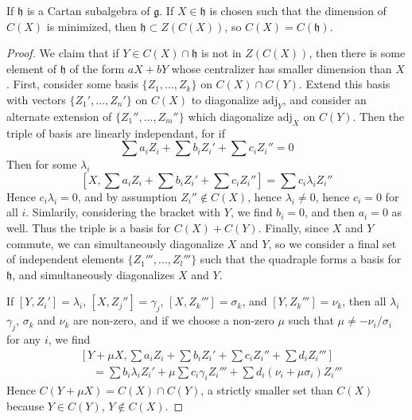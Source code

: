 \begin{lemma}
    If $\mathfrak{h}$ is a Cartan subalgebra of $\mathfrak{g}$. If $X \in \mathfrak{h}$ is chosen such that the dimension of $C(X)$ is minimized, then $\mathfrak{h} \subset Z(C(X))$, so $C(X) = C(\mathfrak{h})$.
\end{lemma}
\begin{proof}
    We claim that if $Y \in C(X) \cap \mathfrak{h}$ is not in $Z(C(X))$, then there is some element of $\mathfrak{h}$ of the form $aX + bY$ whose centralizer has smaller dimension than $X$. First, consider some basis $\{ Z_1, \dots, Z_k \}$ on $C(X) \cap C(Y)$. Extend this basis with vectors $\{ Z_1', \dots, Z_n' \}$ on $C(X)$ to diagonalize $\text{adj}_Y$, and consider an alternate extension of $\{ Z_1'', \dots, Z_m'' \}$ which diagonalize $\text{adj}_X$ on $C(Y)$. Then the triple of basis are linearly independant, for if
    \[ \sum a_i Z_i + \sum b_i Z_i' + \sum c_i Z_i'' = 0 \]
    Then for some $\lambda_i$
    \[ \left[ X, \sum a_i Z_i + \sum b_i Z_i' + \sum c_i Z_i'' \right] = \sum c_i \lambda_i Z_i'' \]
    Hence $c_i \lambda_i = 0$, and by assumption $Z_i'' \not \in C(X)$, hence $\lambda_i \neq 0$, hence $c_i = 0$ for all $i$. Simlarily, considering the bracket with $Y$, we find $b_i = 0$, and then $a_i = 0$ as well. Thus the triple is a basis for $C(X) + C(Y)$. Finally, since $X$ and $Y$ commute, we can simultaneously diagonalize $X$ and $Y$, so we consider a final set of independent elements $\{ Z_1''', \dots, Z_l''' \}$ such that the quadraple forms a basis for $\mathfrak{h}$, and simultaneously diagonalizes $X$ and $Y$.

    If $[Y,Z_i'] = \lambda_i$, $[X,Z_j''] = \gamma_j$, $[X,Z_k'''] = \sigma_k$, and $[Y,Z_k'''] = \nu_k$, then all $\lambda_i$ $\gamma_j$, $\sigma_k$ and $\nu_k$ are non-zero, and if we choose a non-zero $\mu$ such that $\mu \neq - \nu_i/\sigma_i$ for any $i$, we find
    \begin{align*}
        &\left[ Y + \mu X, \sum a_i Z_i + \sum b_i Z_i' + \sum c_i Z_i'' + \sum d_i Z_i''' \right]\\
        &\ \ \ \ \ = \sum b_i \lambda_i Z_i' + \mu \sum c_i \gamma_i Z_i''' + \sum d_i \left( \nu_i + \mu \sigma_i \right) Z_i'''
    \end{align*}
    Hence $C(Y + \mu X) = C(X) \cap C(Y)$, a strictly smaller set than $C(X)$ because $Y \in C(Y)$, $Y \not \in C(X)$.
\end{proof}

